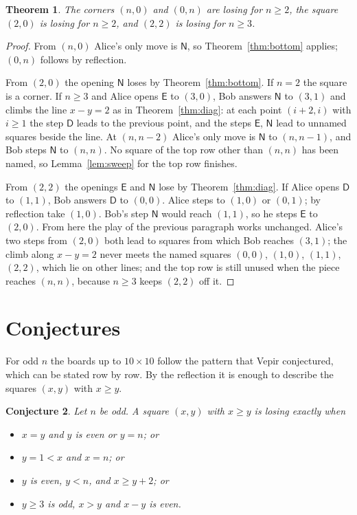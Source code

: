 \documentclass[11pt]{article}
\newtheorem{theorem}{Theorem}
\newtheorem{conjecture}[theorem]{Conjecture}
\theoremstyle{remark}
\newcommand{\E}{\mathsf{E}}
\newcommand{\N}{\mathsf{N}}
\newcommand{\D}{\mathsf{D}}
\begin{document}
\begin{theorem}\label{thm:small}
The corners $(n,0)$ and $(0,n)$ are losing for $n\ge2$, the square $(2,0)$ is losing for
$n\ge 2$, and $(2,2)$ is losing for $n\ge 3$.
\end{theorem}

\begin{proof}
From $(n,0)$ Alice's only move is $\N$, so Theorem~\ref{thm:bottom} applies; $(0,n)$ follows by
reflection.

From $(2,0)$ the opening $\N$ loses by Theorem~\ref{thm:bottom}. If $n=2$ the square is a corner.
If $n\ge3$ and Alice opens $\E$ to $(3,0)$, Bob answers $\N$ to $(3,1)$ and climbs the line
$x-y=2$ as in Theorem~\ref{thm:diag}: at each point $(i+2,i)$ with $i\ge1$ the step $\D$ leads to
the previous point, and the steps $\E$, $\N$ lead to unnamed squares beside the line. At
$(n,n-2)$ Alice's only move is $\N$ to $(n,n-1)$, and Bob steps $\N$ to $(n,n)$. No square of the
top row other than $(n,n)$ has been named, so Lemma~\ref{lem:sweep} for the top row finishes.

From $(2,2)$ the openings $\E$ and $\N$ lose by Theorem~\ref{thm:diag}. If Alice opens $\D$ to
$(1,1)$, Bob answers $\D$ to $(0,0)$. Alice steps to $(1,0)$ or $(0,1)$; by reflection take
$(1,0)$. Bob's step $\N$ would reach $(1,1)$, so he steps $\E$ to $(2,0)$. From here the play of
the previous paragraph works unchanged. Alice's two steps from $(2,0)$ both lead to squares from
which Bob reaches $(3,1)$; the climb along $x-y=2$ never meets the named squares $(0,0)$,
$(1,0)$, $(1,1)$, $(2,2)$, which lie on other lines; and the top row is still unused when the
piece reaches $(n,n)$, because $n\ge3$ keeps $(2,2)$ off it.
\end{proof}

\section{Conjectures}

For odd $n$ the boards up to $10\times 10$ follow the pattern that Vepir conjectured, which can
be stated row by row. By the reflection it is enough to describe the squares $(x,y)$ with
$x\ge y$.

\begin{conjecture}\label{conj:even}
Let $n$ be odd. A square $(x,y)$ with $x\ge y$ is losing exactly when
\begin{itemize}
\item $x=y$ and $y$ is even or $y=n$; or
\item $y=1<x$ and $x=n$; or
\item $y$ is even, $y<n$, and $x\ge y+2$; or
\item $y\ge3$ is odd, $x>y$ and $x-y$ is even.
\end{itemize}
\end{conjecture}
\end{document}
